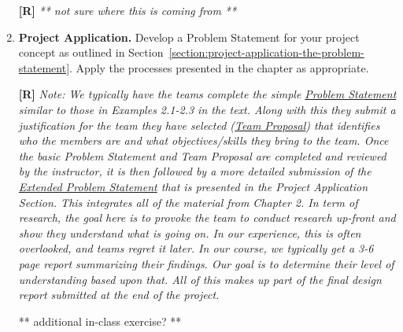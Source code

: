 \begin{enumerate}
  \begin{onlysolution}
  \textbf{[R]}
  \itshape
    ** not sure where this is coming from **
  \end{onlysolution}

\item
  \textbf{Project Application.} Develop a Problem Statement for your
  project concept as outlined in Section~\ref{section:project-application-the-problem-statement}. 
  Apply the processes presented in the chapter as appropriate.

  \begin{onlysolution}
  \textbf{[R]}
  \itshape
  \emph{Note:} We typically have the teams complete the simple \underline{Problem Statement} similar to those 
  in Examples 2.1-2.3 in the text. Along with this they submit a justification for the team they 
  have selected (\underline{Team Proposal}) that identifies who the members are and what objectives/skills they 
  bring to the team.
  Once the basic Problem Statement and Team Proposal are completed and reviewed by the instructor, 
  it is then followed by a more detailed submission of the \underline{Extended Problem Statement} that is presented 
  in the Project Application Section. This integrates all of the material from Chapter 2. In term of 
  research, the goal here is to provoke the team to conduct research up-front and show they understand 
  what is going on. In our experience, this is often overlooked, and teams regret it later. In our course, 
  we typically get a 3-6 page report summarizing their findings. Our goal is to determine their level of 
  understanding based upon that. All of this makes up part of the final design report submitted at the end 
  of the project.
  
  \end{onlysolution}

  ** additional in-class exercise? **

\end{enumerate}
